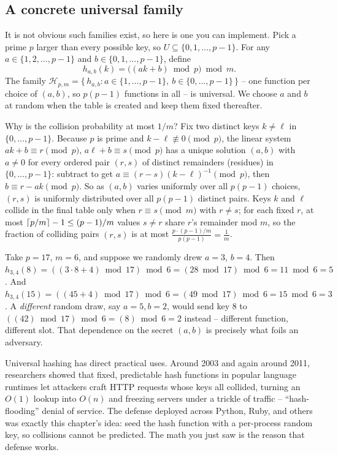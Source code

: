 \subsection{A concrete universal family}

It is not obvious such families exist, so here is one you can implement. Pick a prime $p$ larger than every possible key, so $U \subseteq \{0,1,\dots,p-1\}$. For any $a \in \{1,2,\dots,p-1\}$ and $b \in \{0,1,\dots,p-1\}$, define
\[
  h_{a,b}(k) = \big((a k + b) \bmod p\big) \bmod m.
\]
The family $\mathcal{H}_{p,m} = \{\, h_{a,b} : a \in \{1,\dots,p-1\},\ b \in \{0,\dots,p-1\} \,\}$ -- one function per choice of $(a,b)$, so $p(p-1)$ functions in all -- is universal. We choose $a$ and $b$ at random when the table is created and keep them fixed thereafter.

Why is the collision probability at most $1/m$? Fix two distinct keys $k \neq \ell$ in $\{0,\dots,p-1\}$. Because $p$ is prime and $k - \ell \not\equiv 0 \pmod p$, the linear system $ak + b \equiv r \pmod p$, $a\ell + b \equiv s \pmod p$ has a unique solution $(a,b)$ with $a \neq 0$ for every ordered pair $(r,s)$ of distinct remainders (residues) in $\{0,\dots,p-1\}$: subtract to get $a \equiv (r-s)(k-\ell)^{-1} \pmod p$, then $b \equiv r - ak \pmod p$. So as $(a,b)$ varies uniformly over all $p(p-1)$ choices, $(r,s)$ is uniformly distributed over all $p(p-1)$ distinct pairs. Keys $k$ and $\ell$ collide in the final table only when $r \equiv s \pmod m$ with $r \neq s$; for each fixed $r$, at most $\lceil p/m\rceil - 1 \le (p-1)/m$ values $s \neq r$ share $r$'s remainder mod $m$, so the fraction of colliding pairs $(r,s)$ is at most $\frac{p\cdot(p-1)/m}{p(p-1)} = \frac{1}{m}$.

\begin{example}
Take $p = 17$, $m = 6$, and suppose we randomly drew $a = 3$, $b = 4$. Then $h_{3,4}(8) = ((3\cdot 8 + 4)\bmod 17)\bmod 6 = (28 \bmod 17)\bmod 6 = 11 \bmod 6 = 5$. And $h_{3,4}(15) = ((45+4)\bmod 17)\bmod 6 = (49\bmod 17)\bmod 6 = 15\bmod 6 = 3$. A \emph{different} random draw, say $a=5,b=2$, would send key $8$ to $((42)\bmod 17)\bmod 6 = (8)\bmod 6 = 2$ instead -- different function, different slot. That dependence on the secret $(a,b)$ is precisely what foils an adversary.
\end{example}

\begin{aestheticbox}
Universal hashing has direct practical uses. Around 2003 and again around 2011, researchers showed that fixed, predictable hash functions in popular language runtimes let attackers craft HTTP requests whose keys all collided, turning an $O(1)$ lookup into $O(n)$ and freezing servers under a trickle of traffic -- ``hash-flooding'' denial of service. The defense deployed across Python, Ruby, and others was exactly this chapter's idea: seed the hash function with a per-process random key, so collisions cannot be predicted. The math you just saw is the reason that defense works.
\end{aestheticbox}


